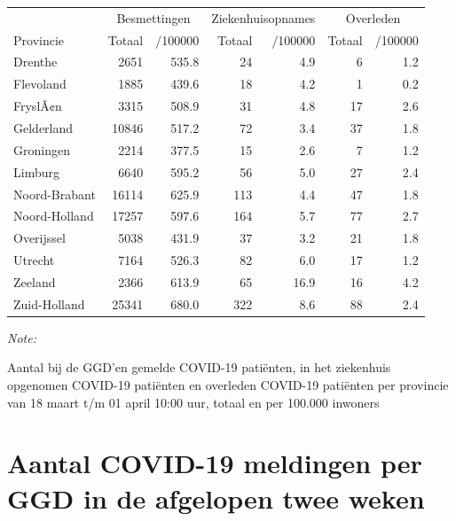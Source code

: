 \documentclass[
  english,
  man,floatsintext]{apa6}
\begin{document}
\begin{table}
\centering
\begin{threeparttable}
\begin{tabular}{lrrrrrr}
\toprule
\multicolumn{1}{c}{ } & \multicolumn{2}{c}{Besmettingen} & \multicolumn{2}{c}{Ziekenhuisopnames} & \multicolumn{2}{c}{Overleden} \\
\cmidrule(l{3pt}r{3pt}){2-3} \cmidrule(l{3pt}r{3pt}){4-5} \cmidrule(l{3pt}r{3pt}){6-7}
Provincie & Totaal & /100000 & Totaal & /100000 & Totaal & /100000\\
\midrule
Drenthe & 2651 & 535.8 & 24 & 4.9 & 6 & 1.2\\
Flevoland & 1885 & 439.6 & 18 & 4.2 & 1 & 0.2\\
FryslÃ¢n & 3315 & 508.9 & 31 & 4.8 & 17 & 2.6\\
Gelderland & 10846 & 517.2 & 72 & 3.4 & 37 & 1.8\\
Groningen & 2214 & 377.5 & 15 & 2.6 & 7 & 1.2\\
Limburg & 6640 & 595.2 & 56 & 5.0 & 27 & 2.4\\
Noord-Brabant & 16114 & 625.9 & 113 & 4.4 & 47 & 1.8\\
Noord-Holland & 17257 & 597.6 & 164 & 5.7 & 77 & 2.7\\
Overijssel & 5038 & 431.9 & 37 & 3.2 & 21 & 1.8\\
Utrecht & 7164 & 526.3 & 82 & 6.0 & 17 & 1.2\\
Zeeland & 2366 & 613.9 & 65 & 16.9 & 16 & 4.2\\
Zuid-Holland & 25341 & 680.0 & 322 & 8.6 & 88 & 2.4\\
\bottomrule
\end{tabular}
\begin{tablenotes}
\item \textit{Note: } 
\item Aantal bij de GGD’en gemelde COVID-19 patiënten, in het ziekenhuis opgenomen COVID-19 patiënten en overleden COVID-19 patiënten per provincie van 18 maart t/m 01 april 10:00 uur, totaal en per 100.000 inwoners
\end{tablenotes}
\end{threeparttable}
\end{table}

\newpage

\hypertarget{aantal-covid-19-meldingen-per-ggd-in-de-afgelopen-twee-weken}{%
\section{Aantal COVID-19 meldingen per GGD in de afgelopen twee weken}\label{aantal-covid-19-meldingen-per-ggd-in-de-afgelopen-twee-weken}}
\end{document}
